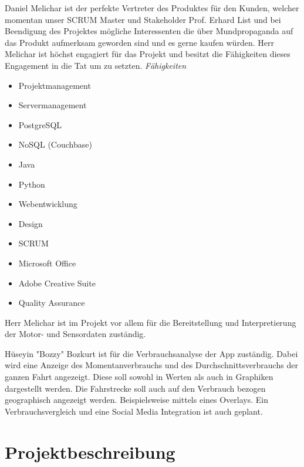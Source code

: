 Daniel Melichar ist der perfekte Vertreter des Produktes für den Kunden, welcher momentan unser SCRUM Master und Stakeholder Prof. Erhard List und bei Beendigung des Projektes mögliche Interessenten die über Mundpropaganda auf das Produkt aufmerksam geworden sind und es gerne kaufen würden. Herr Melichar ist höchst engagiert für das Projekt und besitzt die Fähigkeiten dieses Engagement in die Tat um zu setzten.
\textit{Fähigkeiten}
\begin{itemize}
	\item Projektmanagement
	\item Servermanagement				
	\item PostgreSQL
	\item NoSQL (Couchbase)
	\item Java
	\item Python
	\item Webentwicklung
	\item Design
	\item SCRUM
	\item Microsoft Office
	\item Adobe Creative Suite
	\item Quality Assurance
\end{itemize}
Herr Melichar ist im Projekt vor allem für die Bereitstellung und Interpretierung der Motor- und Sensordaten zuständig. 


Hüseyin "Bozzy" Bozkurt ist für die Verbrauchsanalyse der App zuständig. Dabei wird eine Anzeige des Momentanverbrauchs und des Durchschnittsverbrauchs der ganzen Fahrt angezeigt. Diese soll sowohl in Werten als auch in Graphiken dargestellt werden. Die Fahrstrecke soll auch auf den Verbrauch bezogen geographisch angezeigt werden. Beispielsweise mittels eines Overlays. Ein Verbrauchsvergleich und eine Social Media Integration ist auch geplant.

\section{Projektbeschreibung}

